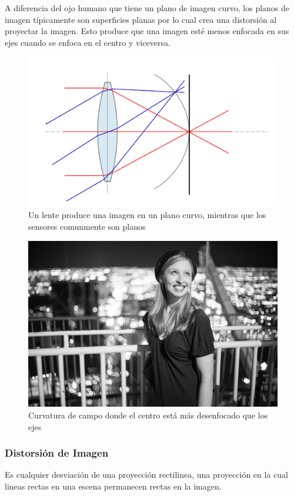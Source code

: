 \documentclass{article}
\begin{document}
A diferencia del ojo humano que tiene un plano de imagen curvo, los planos de imagen típicamente son superficies planas por lo cual crea una distorsión al proyectar la imagen. Esto produce que una imagen esté menos enfocada en sus ejes cuando se enfoca en el centro y viceversa.

\begin{figure}[H]
	\centering
	\includegraphics[width=0.75\linewidth]{Figuras/Field_Curvature}
	\caption{Un lente produce una imagen en un plano curvo, mientras que los sensores comunmente son planos}
	\label{fig:fieldcurvature}
\end{figure}

\begin{figure}[H]
	\centering
	\includegraphics[width=0.85\linewidth]{Figuras/Field_Curvature_2}
	\caption{Curvatura de campo donde el centro está más desenfocado que los ejes}
	\label{fig:fieldcurvature2}
\end{figure}

\subsubsection{Distorsión de Imagen}

Es cualquier desviación de una proyección rectilinea, una proyección en la cual lineas rectas en una escena permanecen rectas en la imagen.
\end{document}
